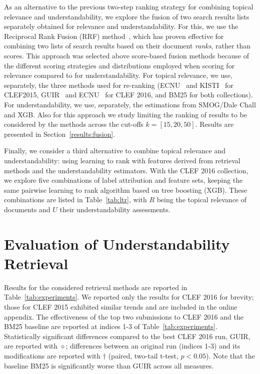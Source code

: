 As an alternative to the previous two-step ranking strategy for combining topical relevance and understandability, we explore the fusion of two search results lists separately obtained for relevance and understandability. For this, we use the Reciprocal Rank Fusion (RRF) method~\cite{cormack09}, which has proven effective for combining two lists of search results based on their document \textit{ranks}, rather than scores. This approach was selected above score-based fusion methods because of the different scoring strategies and distributions employed when scoring for relevance compared to for understandability. For topical relevance, we use, separately, the three methods used for re-ranking (ECNU~\cite{song15} and KISTI~\cite{oh15} for CLEF2015, GUIR~\cite{soldaini16} and ECNU~\cite{song16} for CLEF 2016, and BM25 for both collections). For understandability, we use, separately, the estimations from SMOG/Dale Chall and XGB. Also for this approach we study limiting the ranking of
results to be considered by the methods across the cut-offs $k=[15, 20, 50]$. Results are presented in Section~\ref{results:fusion}.

Finally, we consider a third alternative to combine topical relevance and understandability: using learning to rank with features derived from retrieval methods and the understandability estimators.
With the CLEF 2016 collection, we explore five combinations of label attribution and feature sets, keeping the same pairwise learning to rank algorithm based on tree boosting (XGB).
These combinations are listed in Table~\ref{tab:ltr}, with $R$ being the topical relevance of documents and $U$ their understandability assessments. 

\section{Evaluation of Understandability Retrieval}
\label{sec:results}




Results for the considered retrieval methods are reported in Table~\ref{tab:experiments}. We reported only the results for CLEF 2016 for brevity; those for CLEF 2015 exhibited similar trends and are included in the online appendix. The effectiveness of the top two submissions to CLEF 2016 and the BM25 baseline are reported at indices 1-3 of Table~\ref{tab:experiments}. Statistically significant differences compared to the best CLEF 2016 run, GUIR, are reported with $\diamond$; differences between an original run (indices 1-3) and its modifications are reported with $\dagger$ (paired, two-tail t-test, $p<0.05$). Note that the baseline BM25 is significantly worse than GUIR across all measures. 

